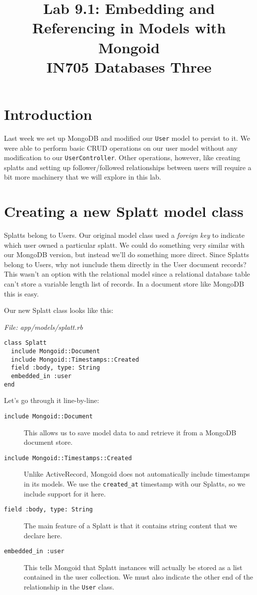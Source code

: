 \documentclass{article}
\begin{document}
\title{Lab 9.1: Embedding and Referencing in Models with Mongoid\\ IN705 Databases Three}
\date{}
\maketitle

\section*{Introduction}
Last week we set up MongoDB and modified our \texttt{User} model to persist to it.  We were able to perform basic CRUD operations on our user model without any modification to our \texttt{UserController}.  Other operations, however, like creating splatts and setting up follower/followed relationships between users will require a bit more machinery that we will explore in this lab.

\section{Creating a new Splatt model class}
Splatts belong to Users. Our original model class used a \emph{foreign key} to indicate which user owned a particular splatt. We could do something very similar with our MongoDB version, but instead we'll do something more direct.  Since Splatts belong to Users, why not iunclude them directly in the User document records?  This wasn't an option with the relational model since a relational database table can't store a variable length list of records.  In a document store like MongoDB this is easy.

Our new Splatt class looks like this:

\emph{File: app/models/splatt.rb}
\begin{verbatim}
class Splatt
  include Mongoid::Document
  include Mongoid::Timestamps::Created
  field :body, type: String
  embedded_in :user
end
\end{verbatim}

Let's go through it line-by-line:

\begin{description}
	\item[\texttt{include Mongoid::Document}] This allows us to save model data to and retrieve it from a MongoDB document store.
	\item[\texttt{include Mongoid::Timestamps::Created}] Unlike ActiveRecord, Mongoid does not automatically include timestamps in its models.  We use the \texttt{created\_at} timestamp with our Splatts, so we include support for it here.
	\item[\texttt{field :body, type: String}] The main feature of a Splatt is that it contains string content that we declare here.
	\item[\texttt{embedded\_in :user}] This tells Mongoid that Splatt instances will actually be stored as a list contained in the user collection.  We must also indicate the other end of the relationship in the \texttt{User} class.
\end{description}
\end{document}
